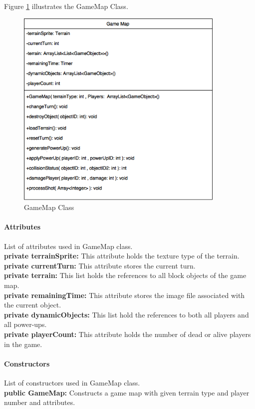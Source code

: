 \documentclass[12pt]{article} %
\begin{document}
Figure \ref{fig:gamemap} illustrates the GameMap Class.
\begin{figure}[h!]
   \centering
   \vspace{10pt}%
   \includegraphics[width=10cm]{gamemap.png}
   \caption{GameMap Class}
   \label{fig:gamemap}
\end{figure}

\paragraph{Attributes\\}

List of attributes used in GameMap class.\\
\textbf{private terrainSprite:} This attribute holds the texture type of the terrain.\\
\textbf{private currentTurn:} This attribute stores the current turn.\\
\textbf{private terrain:} This list holds the references to all block objects of the game map.\\
\textbf{private remainingTime:} This attribute stores the image file associated with the current object.\\
\textbf{private dynamicObjects:} This list hold the references to both all players and all power-ups.\\
\textbf{private playerCount:} This attribute holds the number of dead or alive players in the game.

\paragraph{Constructors \\}
List of constructors used in GameMap class.\\
\textbf{public GameMap:} Constructs a game map with given terrain type and player number and attributes.\\
\end{document}
